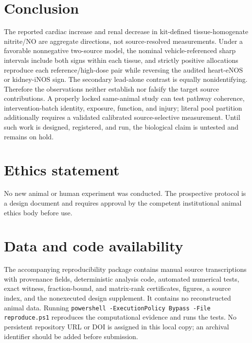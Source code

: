 \documentclass[11pt]{article}
\begin{document}
\section{Conclusion}

The reported cardiac increase and renal decrease in kit-defined tissue-homogenate nitrite/NO are aggregate directions, not source-resolved measurements. Under a favorable nonnegative two-source model, the nominal vehicle-referenced sharp intervals include both signs within each tissue, and strictly positive allocations reproduce each reference/high-dose pair while reversing the audited heart-eNOS or kidney-iNOS sign. The secondary lead-alone contrast is equally nonidentifying. Therefore the observations neither establish nor falsify the target source contributions. A properly locked same-animal study can test pathway coherence, intervention-batch identity, exposure, function, and injury; literal pool partition additionally requires a validated calibrated source-selective measurement. Until such work is designed, registered, and run, the biological claim is untested and remains on hold.

\section*{Ethics statement}

No new animal or human experiment was conducted. The prospective protocol is a design document and requires approval by the competent institutional animal ethics body before use.

\section*{Data and code availability}

The accompanying reproducibility package contains manual source transcriptions with provenance fields, deterministic analysis code, automated numerical tests, exact witness, fraction-bound, and matrix-rank certificates, figures, a source index, and the nonexecuted design supplement. It contains no reconstructed animal data. Running \texttt{powershell -ExecutionPolicy Bypass -File reproduce.ps1} reproduces the computational evidence and runs the tests. No persistent repository URL or DOI is assigned in this local copy; an archival identifier should be added before submission.

{\small
\setlength{\bibsep}{0.35em}


}
\end{document}
